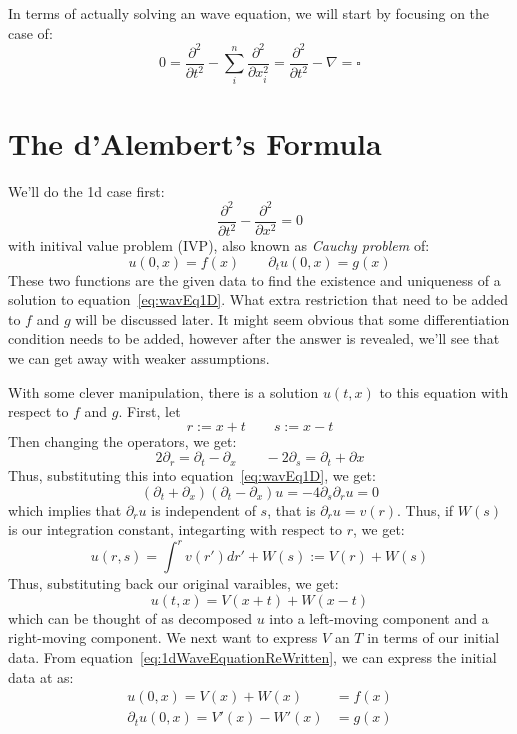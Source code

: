 \documentclass{book}
\begin{document}
In terms of actually solving an wave equation, we will start by focusing on the case of:
\[
	0 = \frac{\partial^2}{\partial t^2} - \sum_i^n \frac{\partial^2}{\partial x_i^2} = \frac{\partial^2}{\partial t^2}
	- \nabla = \square
\]
\section{The d'Alembert's Formula}

We'll do the 1d case first:
\begin{equation}\label{eq:wavEq1D}
	\frac{\partial^2}{\partial t^2} - \frac{\partial^2}{\partial x^2} =0
\end{equation}
with initival value problem (IVP), also known as \emph{Cauchy problem} of:
\[
	u(0, x) = f(x) \qquad \partial_t u(0, x) = g(x)
\]
These two functions are the given data to find the existence and uniqueness of a solution to equation~\ref{eq:wavEq1D}.
What extra restriction that need to be added to $f$ and $g$ will be discussed later. It might seem obvious that some
differentiation condition needs to be added, however after the answer is revealed, we'll see that we can get away with
weaker assumptions.


With some clever manipulation, there is a solution $u(t,x)$ to this equation with respect to $f$ and $g$. First, let
\[
	r := x+t \qquad s := x-t
\]
Then changing the operators, we get:
\[
	 2\partial_r = \partial_t - \partial_x \qquad -2\partial_s = \partial_t + \partial x
\]
Thus, substituting this into equation~\ref{eq:wavEq1D}, we get:
\[
	(\partial_t + \partial_x)(\partial_t - \partial_x)u = -4\partial_s\partial_r u = 0
\]
which implies that $\partial_r u$ is independent of $s$, that is $\partial_r u = v(r)$. Thus, if $W(s)$ is our
integration constant, integarting with respect to $r$, we get:
\[
	u(r,s) = \int^r v(r')dr' + W(s) := V(r) + W(s)
\]
Thus, substituting back our original varaibles, we get:
\begin{equation}\label{eq:1dWaveEquationReWritten}
	u(t,x) = V(x+t) + W(x - t)
\end{equation}
which can be thought of as decomposed $u$ into a left-moving component and a right-moving component. We next want to
express $V$ an $T$ in terms of our initial data. From equation~\ref{eq:1dWaveEquationReWritten}, we can express the
initial data at as:
\begin{align*}
	u(0,x) = V(x) + W(x) &= f(x)\\
	\partial_t u(0,x) = V' (x) - W'(x) &= g(x)
\end{align*}
\end{document}
